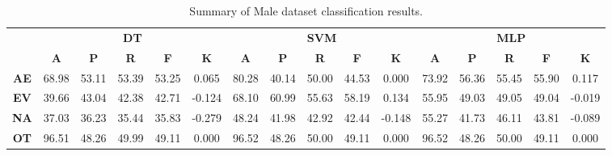 \begin{landscape}
\begin{table}[htbp]
\footnotesize
\centering
\caption{Summary of Male dataset classification results.}
\label{tab:base_female}
\begin{tabular}{|c|c|c|c|c|c|c|c|c|c|c|c|c|c|c|c|}
\hline
\multirow{2}{*}{}	& \multicolumn{5}{c|}{\textbf{DT}}												& \multicolumn{5}{c|}{\textbf{SVM}}												& \multicolumn{5}{c|}{\textbf{MLP}}												\\ \cline{2-16} 
					& \textbf{A}	& \textbf{P}	& \textbf{R}	& \textbf{F}	& \textbf{K}	& \textbf{A}	& \textbf{P}	& \textbf{R}	& \textbf{F}	& \textbf{K}	& \textbf{A}	& \textbf{P}	& \textbf{R}	& \textbf{F}	& \textbf{K}	\\ \hline
\textbf{AE}			& 68.98			& 53.11			& 53.39			& 53.25			& 0.065			& 80.28			& 40.14			& 50.00			& 44.53			& 0.000			& 73.92			& 56.36			& 55.45			& 55.90			& 0.117			\\ \hline
\textbf{EV}			& 39.66			& 43.04			& 42.38			& 42.71			& -0.124			& 68.10			& 60.99			& 55.63			& 58.19			& 0.134			& 55.95			& 49.03			& 49.05			& 49.04			& -0.019			\\ \hline
\textbf{NA}			& 37.03			& 36.23			& 35.44			& 35.83			& -0.279			& 48.24			& 41.98			& 42.92			& 42.44			& -0.148			& 55.27			& 41.73			& 46.11			& 43.81			& -0.089			\\ \hline
\textbf{OT}			& 96.51			& 48.26			& 49.99			& 49.11			& 0.000			& 96.52			& 48.26			& 50.00			& 49.11			& 0.000			& 96.52			& 48.26			& 50.00			& 49.11			& 0.000			\\ \hline
\end{tabular}
\end{table}
\end{landscape}
